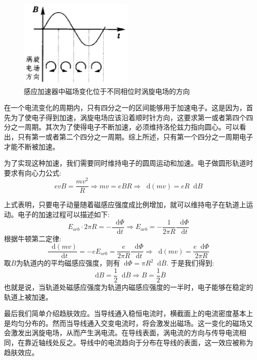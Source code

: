 \documentclass[12pt,a4paper,oneside]{report}
\theoremstyle{definition}
\theoremstyle{remark}
\renewcommand{\d}{\mathop{}\!\mathrm{d}}
\begin{document}
\begin{figure}[h]
\begin{minipage}[t]{0.3\textwidth}
    \includegraphics[width=\textwidth]{4-3.png}
    \caption{感应加速器中磁场变化位于不同相位时涡旋电场的方向}
  \end{minipage}
\end{figure}

在一个电流变化的周期内，只有四分之一的区间能够用于加速电子。这是因为，首先为了使电子得到加速，涡旋电场应该沿着顺时针方向，这要求第一或者第四个四分之一周期。其次为了使得电子不断加速，必须维持洛伦兹力指向圆心。可以看出，只有第一或者第二个四分之一周期。综上所述，只有第一个四分之一周期电子才能不断被加速。

为了实现这种加速，我们需要同时维持电子的圆周运动和加速。电子做圆形轨道时要求有向心力公式:
\[
evB = \frac{mv^2}{R} \Rightarrow mv = eBR \Rightarrow \d(mv) = eR\d B
\]

上式表明，只要电子动量随着磁感应强度成比例增加，就可以维持电子在轨道上运动。电子的加速过程可以描述如下:
\[
E_{orb} \cdot 2\pi R = -\frac{\d \Phi}{\d t} \Rightarrow 
E_{orb} = -\frac{1}{2\pi R}\frac{\d \Phi}{\d t}
\]
根据牛顿第二定律:
\[
\frac{\d (mv)}{\d t}=-eE_{orb}=\frac{e}{2\pi R}\frac{\d \Phi}{\d t} \Rightarrow \d(mv)  =\frac{e \d \Phi}{2\pi R}
\]
取$\overline{B}$为轨道内的平均磁感应强度，则有$\d \Phi = \pi R^2\d \overline{B}$. 于是我们得到:
\[
\d B = \frac{1}{2}\d \overline{B} \Rightarrow B = \frac{1}{2}\overline{B}
\]
也就是说，当轨道处磁感应强度为轨道内磁感应强度的一半时，电子能够在稳定的轨道上被加速。

最后我们简单介绍趋肤效应。当导线通入稳恒电流时，横截面上的电流密度基本上是均匀分布的。然而当导线通入交变电流时，将会激发出磁场。这一变化的磁场又会激发出涡旋电场，从而产生涡电流。在导线表面，涡电流的方向与传导电流相同，在靠近轴线处反之。导线中的电流趋向于分布在导线的表面，这一效应被称为趋肤效应。
\end{document}
